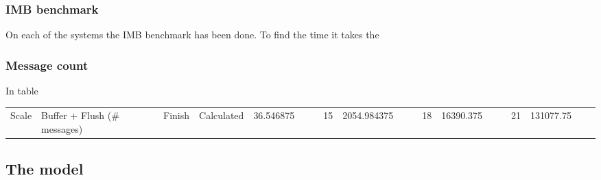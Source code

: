 \subsubsection{IMB benchmark}
On each of the systems the IMB benchmark has been done. To find the time it takes the 

\subsubsection{Message count}
In table

\begin{table}
\begin{tabular}{|l|l|l|l|}
\hline
Scale & Buffer $+$ Flush (# messages) & Finish & Calculated  &	 36.546875 & &&
15 & 2054.984375 &&&
18 & 16390.375 &&&
21 & 131077.75 &&&

\end{tabular}

\end{table}
\subsection{The model}
